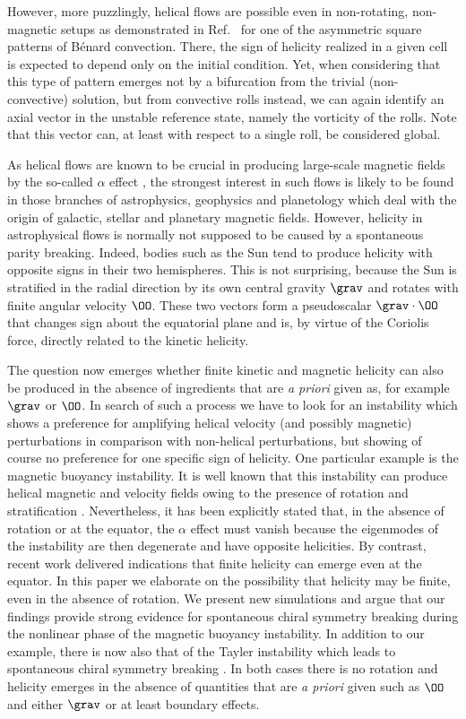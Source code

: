 \documentclass[twocolumn,showpacs,preprintnumbers,superscriptaddress]{revtex4}
\begin{document}
However, more puzzlingly, helical flows are possible even in 
non-rotating, non-magnetic setups as demonstrated in Ref.~\cite{DemSee02}
for one of the asymmetric square patterns of B{\'e}nard convection.
There, the sign of helicity realized in a given cell
is expected to depend
only on the initial condition. 
Yet, when considering that this type of pattern emerges not by a
bifurcation from the trivial
(non-convective)
solution, but from convective rolls
instead, we can again identify an axial vector in the unstable reference
state, namely the vorticity of the rolls.
Note that this vector can, 
at least with respect to a single roll, be considered global.

As helical flows are known to be crucial in producing large-scale
magnetic fields by the so-called $\alpha$ effect \cite{KR80},
the strongest interest in such flows is likely to be found in those
branches of astrophysics, geophysics and planetology which deal with
the origin of galactic, stellar and planetary magnetic fields.  However,
helicity in astrophysical flows is normally not supposed to be caused by
a spontaneous parity breaking.  Indeed, bodies such as the Sun tend to
produce helicity with opposite signs in their two hemispheres.  This is
not surprising, because the Sun is stratified in the radial direction
by its own central gravity $\grav$ and rotates with finite angular
velocity $\OO$.  These two vectors form a pseudoscalar $\grav\cdot\OO$
that changes sign about the equatorial plane and is, by virtue of the
Coriolis force, directly related to the kinetic helicity.

The question now emerges whether finite kinetic and magnetic helicity
can also be produced in the absence of
ingredients that are {\it a priori} given as, for example $\grav$ or $\OO$.
In search of such a process we have to look for an instability
which shows a preference for amplifying helical
velocity (and possibly magnetic) perturbations
in comparison with non-helical perturbations,
but showing of course no preference for one specific sign of helicity.
One particular example is the magnetic buoyancy instability.
It is well known that this instability can produce helical magnetic
and velocity fields owing to the presence of rotation and stratification
\cite{Thelen}.
Nevertheless, it has been explicitly stated \cite{DH11,Thelen}
that, in the absence of rotation or at the equator, the $\alpha$ effect
must vanish because the eigenmodes of the instability are then
degenerate and have opposite helicities.
By contrast, recent work \cite{CMRB10} delivered indications that finite
helicity can emerge even at the equator.
In this paper we elaborate on the possibility that helicity
may be finite, even in the absence of rotation.
We present new simulations
and argue that our findings provide strong evidence for spontaneous
chiral symmetry breaking during the nonlinear phase of the magnetic
buoyancy instability.
In addition to our example, there is now also that of the Tayler
instability which leads to spontaneous chiral symmetry breaking
\cite{GRH11}.
In both cases there is no rotation and helicity emerges in the absence of
quantities that are {\it a priori} given 
such as $\OO$ and either $\grav$ or at least boundary effects.
\end{document}
